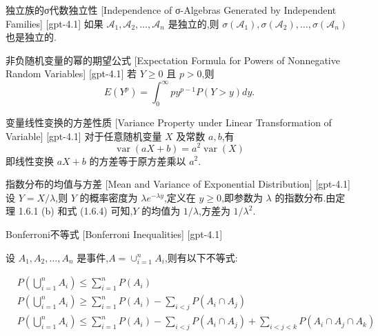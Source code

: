 \documentclass[UTF8]{ctexart}
\begin{document}
    
    
    \begin{thm}
        {独立族的σ代数独立性}
        [Independence of σ-Algebras Generated by Independent Families]
        [gpt-4.1]
        如果 $\mathcal{A}_1, \mathcal{A}_2, \ldots, \mathcal{A}_n$ 是独立的,则 $\sigma({\mathcal{A}}_1), \sigma({\mathcal{A}}_2), \ldots, \sigma({\mathcal{A}}_n)$ 也是独立的.
    \end{thm}
    
    
    
    \begin{lma}
        {非负随机变量的幂的期望公式}
        [Expectation Formula for Powers of Nonnegative Random Variables]
        [gpt-4.1]
        若 $Y \geq 0$ 且 $p > 0$,则
\[
E( Y^{p} ) = \int_{0}^{\infty} p y^{p-1} P( Y > y ) d y.
\]

    \end{lma}
    
    
    
    \begin{ppt}
        {变量线性变换的方差性质}
        [Variance Property under Linear Transformation of Variable]
        [gpt-4.1]
        对于任意随机变量 $X$ 及常数 $a, b$,有
\[
\operatorname{var}( a X + b ) = a^{2} \operatorname{var}( X )
\]
即线性变换 $aX + b$ 的方差等于原方差乘以 $a^2$.

    \end{ppt}
    
    
    
    \begin{thm}
        {指数分布的均值与方差}
        [Mean and Variance of Exponential Distribution]
        [gpt-4.1]
        设 $Y = X / \lambda$,则 $Y$ 的概率密度为 $\lambda e^{-\lambda y}$,定义在 $y \ge 0$,即参数为 $\lambda$ 的指数分布.由定理 1.6.1 (b) 和式 (1.6.4) 可知,$Y$ 的均值为 $1/\lambda$,方差为 $1/\lambda^{2}$.
    \end{thm}
    
    
    
    \begin{thm}
        {Bonferroni不等式}
        [Bonferroni Inequalities]
        [gpt-4.1]
        
设 $A_1, A_2, \ldots, A_n$ 是事件,$A = \cup_{i=1}^n A_i$,则有以下不等式:

\[
\begin{array}{rl}
& P\left(\bigcup_{i=1}^n A_i\right) \leq \sum_{i=1}^n P(A_i) \\
& P\left(\bigcup_{i=1}^n A_i\right) \geq \sum_{i=1}^n P(A_i) - \sum_{i<j} P(A_i \cap A_j) \\
& P\left(\bigcup_{i=1}^n A_i\right) \leq \sum_{i=1}^n P(A_i) - \sum_{i<j} P(A_i \cap A_j) + \sum_{i<j<k} P(A_i \cap A_j \cap A_k)
\end{array}
\]

    \end{thm}
    
\end{document}
